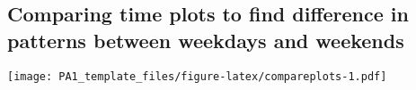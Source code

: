 \documentclass[]{article}
\newenvironment{Shaded}{\begin{snugshade}}{\end{snugshade}}
\newcommand{\KeywordTok}[1]{\textcolor[rgb]{0.13,0.29,0.53}{\textbf{{#1}}}}
\newcommand{\DataTypeTok}[1]{\textcolor[rgb]{0.13,0.29,0.53}{{#1}}}
\newcommand{\DecValTok}[1]{\textcolor[rgb]{0.00,0.00,0.81}{{#1}}}
\newcommand{\StringTok}[1]{\textcolor[rgb]{0.31,0.60,0.02}{{#1}}}
\newcommand{\NormalTok}[1]{{#1}}
\begin{document}
\subsection{Comparing time plots to find difference in patterns between
weekdays and
weekends}\label{comparing-time-plots-to-find-difference-in-patterns-between-weekdays-and-weekends}

\begin{Shaded}
\end{Shaded}

\texttt{[image: PA1\_template\_files/figure-latex/compareplots-1.pdf]}
\end{document}
